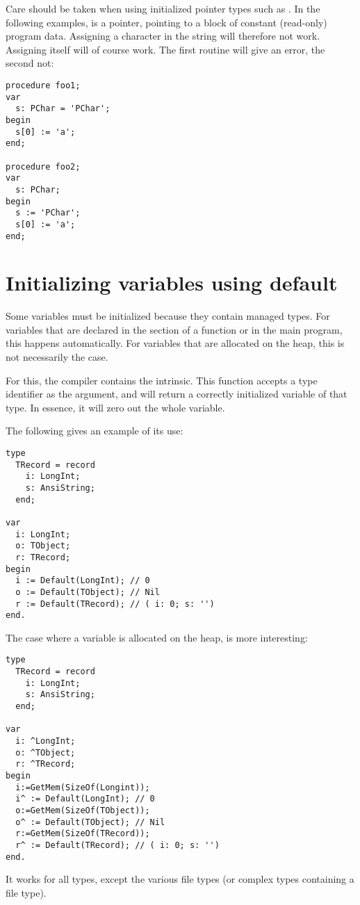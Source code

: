 \begin{remark}
Care should be taken when using initialized pointer types such as .
In the following examples,  is a pointer, pointing to a block of constant
(read-only) program data.
Assigning a character in the string will therefore not work. Assigning  itself will
of course work. The first routine will give an error, the second not:
\begin{verbatim}
procedure foo1;
var
  s: PChar = 'PChar';
begin
  s[0] := 'a';
end;

procedure foo2;
var
  s: PChar;
begin
  s := 'PChar';
  s[0] := 'a';
end;
\end{verbatim}
\end{remark}

\section{Initializing variables using default}
\label{se:initusingdefault}
Some variables must be initialized because they contain managed types.
For variables that are declared in the   section of a function or in the main program, this happens automatically.
For variables that are allocated on the heap, this is not necessarily the case.

For this, the compiler contains the  intrinsic. This function accepts a type identifier as the argument,
and will return a correctly initialized variable of that type. In essence, it will zero out the whole variable.

The following gives an example of its use:
\begin{verbatim}
type
  TRecord = record
    i: LongInt;
    s: AnsiString;
  end;

var
  i: LongInt;
  o: TObject;
  r: TRecord;
begin
  i := Default(LongInt); // 0
  o := Default(TObject); // Nil
  r := Default(TRecord); // ( i: 0; s: '')
end.
\end{verbatim}
The case where a variable is allocated on the heap, is more interesting:
\begin{verbatim}
type
  TRecord = record
    i: LongInt;
    s: AnsiString;
  end;

var
  i: ^LongInt;
  o: ^TObject;
  r: ^TRecord;
begin
  i:=GetMem(SizeOf(Longint));
  i^ := Default(LongInt); // 0
  o:=GetMem(SizeOf(TObject));
  o^ := Default(TObject); // Nil
  r:=GetMem(SizeOf(TRecord));
  r^ := Default(TRecord); // ( i: 0; s: '')
end.
\end{verbatim}
It works for all types, except the various file types (or complex types containing a file type).


